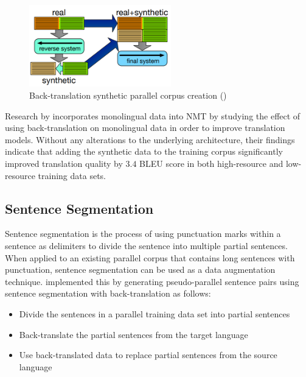 \begin{figure}[ht!]
\centering
\includegraphics[width=0.55\textwidth]{media/literature/data_argumentation/da_back_trans.png}
\caption[Diagram of the back-translation synthetic parallel corpus]{Back-translation synthetic parallel corpus creation (\cite{hoang_iterative_2018})}
\label{fig:back_trans}
\end{figure}
Research by \cite{sennrich_improving_2016} incorporates monolingual data into \acrshort{NMT} by studying the effect of using back-translation on monolingual data in order to improve translation models.  Without any alterations to the underlying architecture, their findings indicate that adding the synthetic data to the training corpus significantly improved translation quality by $3.4$ BLEU score in both high-resource and low-resource training data sets.


\subsection{Sentence Segmentation}

Sentence segmentation is the process of using punctuation marks within a sentence as delimiters to divide the sentence into multiple partial sentences. When applied to an existing parallel corpus that contains long sentences with punctuation, sentence segmentation can be used as a data augmentation technique. \cite{zhang_corpus_2019} implemented this by generating pseudo-parallel sentence pairs using sentence segmentation with back-translation as follows:
\begin{itemize}
    \item Divide the sentences in a parallel training data set into partial sentences
    \item Back-translate the partial sentences from the target language
    \item Use back-translated data to replace partial sentences from the source language
\end{itemize}

